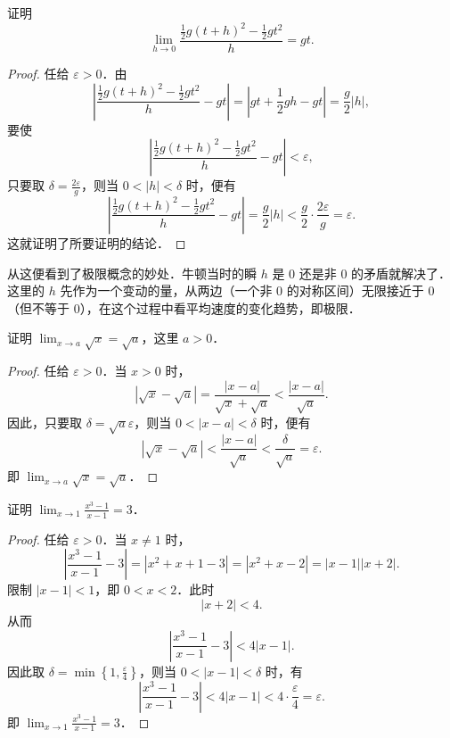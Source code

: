 \begin{example}\label{ex:3-3-1}
证明
\[
\lim_{h \to 0} \frac{\frac{1}{2}g(t+h)^2 - \frac{1}{2}gt^2}{h} = gt.
\]
\end{example}

\begin{proof}
任给 $\varepsilon > 0$．由
\[
\left|\frac{\frac{1}{2}g(t+h)^2 - \frac{1}{2}gt^2}{h} - gt\right| = \left|gt + \frac{1}{2}gh - gt\right| = \frac{g}{2}|h|,
\]
要使
\[
\left|\frac{\frac{1}{2}g(t+h)^2 - \frac{1}{2}gt^2}{h} - gt\right| < \varepsilon,
\]
只要取 $\delta = \frac{2\varepsilon}{g}$，则当 $0 < |h| < \delta$ 时，便有
\[
\left|\frac{\frac{1}{2}g(t+h)^2 - \frac{1}{2}gt^2}{h} - gt\right| = \frac{g}{2}|h| < \frac{g}{2} \cdot \frac{2\varepsilon}{g} = \varepsilon.
\]
这就证明了所要证明的结论．
\end{proof}

从这便看到了极限概念的妙处．牛顿当时的瞬 $h$ 是 0 还是非 0 的矛盾就解决了．这里的 $h$ 先作为一个变动的量，从两边（一个非 0 的对称区间）无限接近于 $0$（但不等于 $0$），在这个过程中看平均速度的变化趋势，即极限．

\begin{example}\label{ex:3-3-2}
证明 $\lim_{x \to a} \sqrt{x} = \sqrt{a}$，这里 $a > 0$．
\end{example}

\begin{proof}
任给 $\varepsilon > 0$．当 $x > 0$ 时，
\[
|\sqrt{x} - \sqrt{a}| = \frac{|x - a|}{\sqrt{x} + \sqrt{a}} < \frac{|x - a|}{\sqrt{a}}.
\]
因此，只要取 $\delta = \sqrt{a}\varepsilon$，则当 $0 < |x - a| < \delta$ 时，便有
\[
|\sqrt{x} - \sqrt{a}| < \frac{|x - a|}{\sqrt{a}} < \frac{\delta}{\sqrt{a}} = \varepsilon.
\]
即 $\lim_{x \to a} \sqrt{x} = \sqrt{a}$．
\end{proof}

\begin{example}\label{ex:3-3-3}
证明 $\lim_{x \to 1} \frac{x^3 - 1}{x - 1} = 3$．
\end{example}

\begin{proof}
任给 $\varepsilon > 0$．当 $x \neq 1$ 时，
\[
\left|\frac{x^3 - 1}{x - 1} - 3\right| = |x^2 + x + 1 - 3| = |x^2 + x - 2| = |x - 1||x + 2|.
\]
限制 $|x - 1| < 1$，即 $0 < x < 2$．此时
\[
|x + 2| < 4.
\]
从而
\[
\left|\frac{x^3 - 1}{x - 1} - 3\right| < 4|x - 1|.
\]
因此取 $\delta = \min\left\{1, \frac{\varepsilon}{4}\right\}$，则当 $0 < |x - 1| < \delta$ 时，有
\[
\left|\frac{x^3 - 1}{x - 1} - 3\right| < 4|x - 1| < 4 \cdot \frac{\varepsilon}{4} = \varepsilon.
\]
即 $\lim_{x \to 1} \frac{x^3 - 1}{x - 1} = 3$．
\end{proof}

